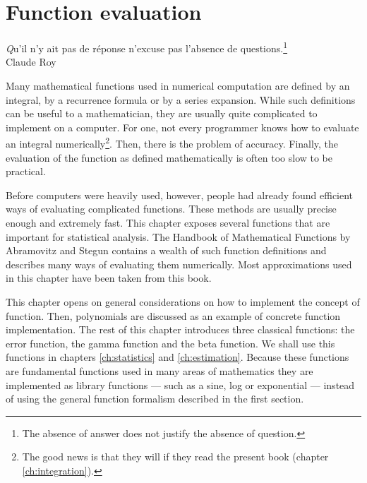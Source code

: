 %
%

\chapter{Function evaluation}
\label{ch:function} \vspace{1 ex}
\begin{flushright}
{\textsl Qu'il n'y ait pas de r\'eponse n'excuse pas l'absence de
questions.}\footnote{The absence of answer does not justify the
absence of question.}\\ Claude Roy
\end{flushright}
\vspace{1 ex} Many mathematical functions used in numerical
computation are defined by an integral, by a recurrence formula or
by a series expansion. While such definitions can be useful to a
mathematician, they are usually quite complicated to implement on
a computer. For one, not every programmer knows how to evaluate an
integral numerically\footnote{The good news is that they will if
they read the present book (\cf chapter \ref{ch:integration}).}.
Then, there is the problem of accuracy. Finally, the evaluation of
the function as defined mathematically is often too slow to be
practical.

Before computers were heavily used, however, people had already
found efficient ways of evaluating complicated functions. These
methods are usually precise enough and extremely fast. This
chapter exposes several functions that are important for
statistical analysis. The Handbook of Mathematical Functions by
Abramovitz and Stegun \cite{AbrSteg} contains a wealth of such
function definitions and describes many ways of evaluating them
numerically. Most approximations used in this chapter have been
taken from this book.

This chapter opens on general considerations on how to implement
the concept of function. Then, polynomials are discussed as an
example of concrete function implementation. The rest of this
chapter introduces three classical functions: the error function,
the gamma function and the beta function. We shall use this
functions in chapters \ref{ch:statistics} and \ref{ch:estimation}.
Because these functions are fundamental functions used in many
areas of mathematics they are implemented as library functions ---
such as a sine, log or exponential --- instead of using the
general function formalism described in the first section.

